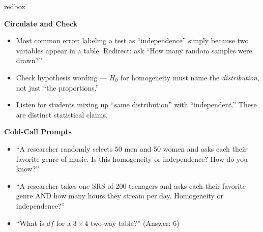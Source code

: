 \documentclass[10pt]{article}
\begin{document}
\begin{skillbox}{redbox}
\begin{minipage}[t]{0.48\linewidth}
    \textbf{Circulate and Check}
    \begin{itemize}
        \item Most common error: labeling a test as ``independence'' simply because
              two variables appear in a table. Redirect: ask ``How many random samples
              were drawn?''
        \item Check hypothesis wording --- $H_0$ for homogeneity must name the
              \emph{distribution}, not just ``the proportions.''
        \item Listen for students mixing up ``same distribution'' with
              ``independent.'' These are distinct statistical claims.
    \end{itemize}
\end{minipage}
\hfill
\begin{minipage}[t]{0.48\linewidth}
    \textbf{Cold-Call Prompts}
    \begin{itemize}
        \item ``A researcher randomly selects 50 men and 50 women and asks each
              their favorite genre of music. Is this homogeneity or independence?
              How do you know?''
        \item ``A researcher takes one SRS of 200 teenagers and asks each their
              favorite genre AND how many hours they stream per day. Homogeneity
              or independence?''
        \item ``What is $df$ for a $3 \times 4$ two-way table?'' (Answer: 6)
    \end{itemize}
\end{minipage}
\end{skillbox}
\end{document}
